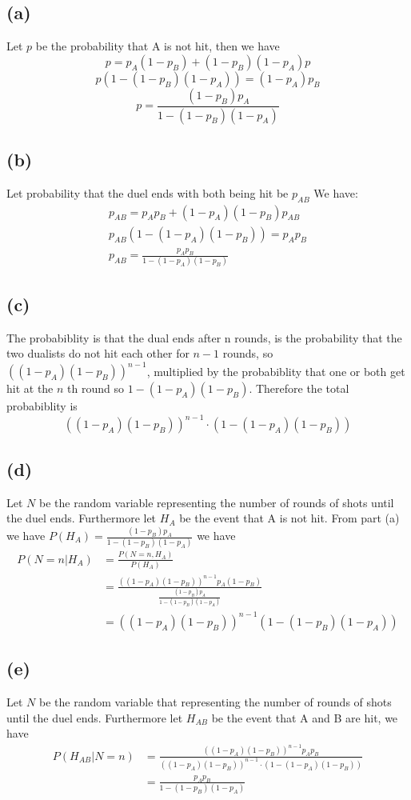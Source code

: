 \subsection*{(a)}
Let $p$ be the probability that A is not hit, then we have
$$p=p_A(1-p_B)+(1-p_B)(1-p_A)p$$
$$p(1-(1-p_B)(1-p_A))=(1-p_A)p_B$$
$$p=\boxed{\frac{(1-p_B)p_A}{1-(1-p_B)(1-p_A)}}$$
\subsection*{(b)}
Let probability that the duel ends with both being hit be $p_{AB}$
We have:
\begin{align*}
    p_{AB}=p_Ap_B+(1-p_A)(1-p_B)p_{AB}\\
    p_{AB}\left(1-(1-p_A)(1-p_B)\right)=p_Ap_B\\
    p_{AB}=\boxed{\frac{p_Ap_B}{1-(1-p_A)(1-p_B)}}
\end{align*}
\subsection*{(c)}
The probabiblity is that the dual ends after n rounds, is the probability
that the two dualists do not hit each other for $n-1$ rounds, so $\left((1-p_A)(1-p_B)\right)^{n-1}$,
multiplied by the probabiblity that one or both get hit at the $n$ th round
so $1-(1-p_A)(1-p_B)$. Therefore the total probabiblity is 
$$\boxed{\left((1-p_A)(1-p_B)\right)^{n-1}\cdot(1-(1-p_A)(1-p_B))}$$
\subsection*{(d)}
Let $N$ be the random variable representing the number of rounds
of shots until the duel ends. Furthermore let $H_A$ be the event that A is not hit. 
From part (a) we have $P(H_A)=\frac{(1-p_B)p_A}{1-(1-p_B)(1-p_A)}$
we have
\begin{align*}
    P(N=n|H_A)&=\frac{P(N=n,H_A)}{P(H_A)}\\
    &=\frac{\left((1-p_A)(1-p_B)\right)^{n-1}p_A(1-p_B)}{\frac{(1-p_B)p_A}{1-(1-p_B)(1-p_A)}}\\
    &=\boxed{\left((1-p_A)(1-p_B)\right)^{n-1}\left(1-(1-p_B)(1-p_A)\right)}
\end{align*}
\subsection*{(e)}
Let $N$ be the random variable that representing the number of rounds
of shots until the duel ends. Furthermore let $H_{AB}$ be the event that A and B are hit, we have
\begin{align*}
    P(H_{AB}|N=n)&=\frac{\left((1-p_A)(1-p_B)\right)^{n-1}p_Ap_B}{\left((1-p_A)(1-p_B)\right)^{n-1}\cdot(1-(1-p_A)(1-p_B))}\\
    &=\boxed{\frac{p_Ap_B}{1-(1-p_B)(1-p_A)}}
\end{align*}

